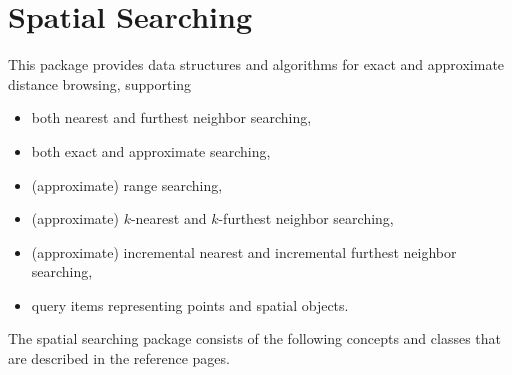 \chapter{Spatial Searching}
\label{ChapterReferenceSpatialSearching}

This package provides data structures and algorithms for exact and approximate distance browsing,
supporting

\begin{itemize} 

\item
both nearest and furthest neighbor searching,

\item
both exact and approximate searching,

\item
(approximate) range searching,

\item 
(approximate) $k$-nearest and $k$-furthest neighbor searching,

\item 
(approximate) incremental nearest and incremental furthest neighbor searching,

\item
query items representing points and spatial objects.

\end{itemize}



The spatial searching package consists of the following concepts and
classes that are described in the reference pages.





 \\
 \\
 \\
 \\


 \\


